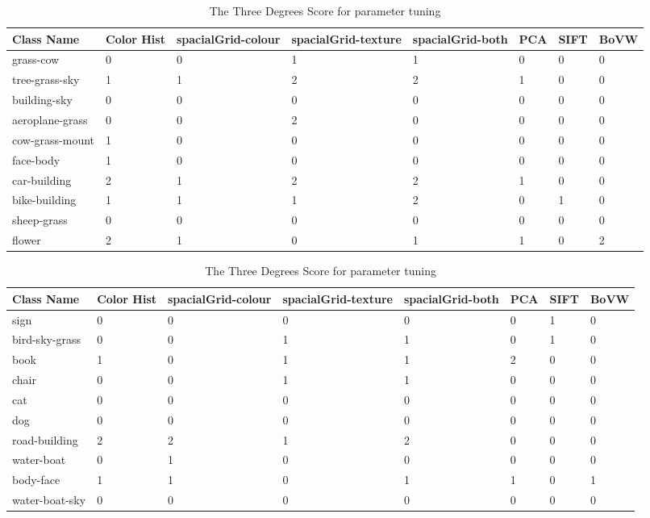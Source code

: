 \documentclass{article}
\begin{document}
\begin{table}[h]
  \caption{The Three Degrees Score for parameter tuning} %
  \centering %
  \label{table:parameter-tuning}
  \begin{tabular}{ |p{2cm}||p{1.5cm}|p{1.5cm}|p{1.5cm}|p{1.5cm}|p{1.5cm}|p{1.5cm}|p{1.5cm}| }
    \hline
    \hline
    \textbf{Class Name} & \small{Color Hist} & \small{spacialGrid-colour} & \small{spacialGrid-texture} & \small{spacialGrid-both} & \small{PCA} & \small{SIFT} & \small{BoVW} \\
    \hline
    grass-cow & 0 & 0 & 1 & 1 & 0 & 0 & 0 \\
    tree-grass-sky & 1 & 1 & 2 & 2 & 1 & 0 & 0 \\
    building-sky & 0 & 0 & 0 & 0 & 0 & 0 & 0 \\
    aeroplane-grass & 0 & 0 & 2 & 0 & 0 & 0 & 0 \\
    cow-grass-mount & 1 & 0 & 0 & 0 & 0 & 0 & 0 \\
    face-body & 1 & 0 & 0 & 0 & 0 & 0 & 0 \\
    car-building & 2 & 1 & 2 & 2 & 1 & 0 & 0 \\
    bike-building & 1 & 1 & 1 & 2 & 0 & 1 & 0 \\
    sheep-grass & 0 & 0 & 0 & 0 & 0 & 0 & 0 \\
    flower & 2 & 1 & 0 & 1 & 1 & 0 & 2 \\
    \hline
    \end{tabular}
  \begin{tabular}{ |p{2cm}||p{1.5cm}|p{1.5cm}|p{1.5cm}|p{1.5cm}|p{1.5cm}|p{1.5cm}|p{1.5cm}| }
    \hline
    \hline
    \textbf{Class Name} & \small{Color Hist} & \small{spacialGrid-colour} & \small{spacialGrid-texture} & \small{spacialGrid-both} & \small{PCA} & \small{SIFT} & \small{BoVW} \\
    \hline
    sign & 0 & 0 & 0 & 0 & 0 & 1 & 0 \\
    bird-sky-grass & 0 & 0 & 1 & 1 & 0 & 1 & 0 \\
    book & 1 & 0 & 1 & 1 & 2 & 0 & 0 \\
    chair & 0 & 0 & 1 & 1 & 0 & 0 & 0 \\
    cat & 0 & 0 & 0 & 0 & 0 & 0 & 0 \\
    dog & 0 & 0 & 0 & 0 & 0 & 0 & 0 \\
    road-building & 2 & 2 & 1 & 2 & 0 & 0 & 0 \\
    water-boat & 0 & 1 & 0 & 0 & 0 & 0 & 0 \\
    body-face & 1 & 1 & 0 & 1 & 1 & 0 & 1 \\
    water-boat-sky & 0 & 0 & 0 & 0 & 0 & 0 & 0 \\
    \hline
    \end{tabular}
  
\end{table}
\end{document}
